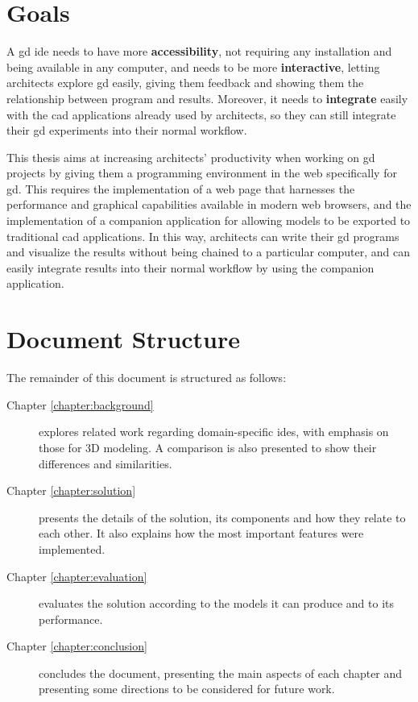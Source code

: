 \section{Goals}
A \gls{gd} \gls{ide} needs to have more \textbf{accessibility}, not requiring any installation and being available in any computer, and needs to be more \textbf{interactive}, letting architects explore \gls{gd} easily, giving them feedback and showing them the relationship between program and results.
Moreover, it needs to \textbf{integrate} easily with the \gls{cad} applications already used by architects, so they can still integrate their \gls{gd} experiments into their normal workflow.

This thesis aims at increasing architects' productivity when working on \gls{gd} projects by giving them a programming environment in the web specifically for \gls{gd}.
This requires the implementation of a web page that harnesses the performance and graphical capabilities available in modern web browsers, and the implementation of a companion application for allowing models to be exported to traditional \gls{cad} applications.
In this way, architects can write their \gls{gd} programs and visualize the results without being chained to a particular computer, and can easily integrate results into their normal workflow by using the companion application.


\section{Document Structure}
The remainder of this document is structured as follows:
\begin{description}
  \item[Chapter \ref{chapter:background}] explores related work regarding domain-specific \glspl{ide}, with emphasis on those for 3D modeling. A comparison is also presented to show their differences and similarities.
  \item[Chapter \ref{chapter:solution}] presents the details of the solution, its components and how they relate to each other. It also explains how the most important features were implemented.
  \item[Chapter \ref{chapter:evaluation}] evaluates the solution according to the models it can produce and to its performance.
  \item[Chapter \ref{chapter:conclusion}] concludes the document, presenting the main aspects of each chapter and presenting some directions to be considered for future work.
\end{description}



